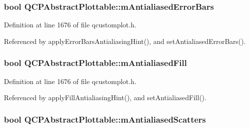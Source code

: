 \subsubsection[{m\+Antialiased\+Error\+Bars}]{\setlength{\rightskip}{0pt plus 5cm}bool Q\+C\+P\+Abstract\+Plottable\+::m\+Antialiased\+Error\+Bars\hspace{0.3cm}{\ttfamily [protected]}}\label{class_q_c_p_abstract_plottable_ad48660b2bd301576e92fb033d8f455ea}


Definition at line 1676 of file qcustomplot.\+h.



Referenced by apply\+Error\+Bars\+Antialiasing\+Hint(), and set\+Antialiased\+Error\+Bars().

\hypertarget{class_q_c_p_abstract_plottable_a152ac765bedf927fb240545d11d453ea}{}
\subsubsection[{m\+Antialiased\+Fill}]{\setlength{\rightskip}{0pt plus 5cm}bool Q\+C\+P\+Abstract\+Plottable\+::m\+Antialiased\+Fill\hspace{0.3cm}{\ttfamily [protected]}}\label{class_q_c_p_abstract_plottable_a152ac765bedf927fb240545d11d453ea}


Definition at line 1676 of file qcustomplot.\+h.



Referenced by apply\+Fill\+Antialiasing\+Hint(), and set\+Antialiased\+Fill().

\hypertarget{class_q_c_p_abstract_plottable_aa115755e525a8e3a86dc683f9cab755b}{}
\subsubsection[{m\+Antialiased\+Scatters}]{\setlength{\rightskip}{0pt plus 5cm}bool Q\+C\+P\+Abstract\+Plottable\+::m\+Antialiased\+Scatters\hspace{0.3cm}{\ttfamily [protected]}}\label{class_q_c_p_abstract_plottable_aa115755e525a8e3a86dc683f9cab755b}


